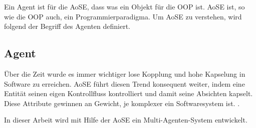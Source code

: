 Ein Agent ist für die AoSE, dass was ein Objekt für die OOP ist. AoSE ist, so wie die OOP auch, ein Programmierparadigma. Um AoSE zu verstehen, wird folgend der Begriff des Agenten definiert.

\subsection{Agent}
\label{chap:aose_agent}


Über die Zeit wurde es immer wichtiger lose Kopplung und hohe Kapselung in Software zu erreichen. AoSE führt diesen Trend konsequent weiter, indem eine Entität seinen eigen Kontrollfluss kontrolliert und damit seine Absichten kapselt. Diese Attribute gewinnen an Gewicht, je komplexer ein Softwaresystem ist. \cite{article:flexibleSoftware}.

In dieser Arbeit wird mit Hilfe der AoSE ein Multi-Agenten-System entwickelt.